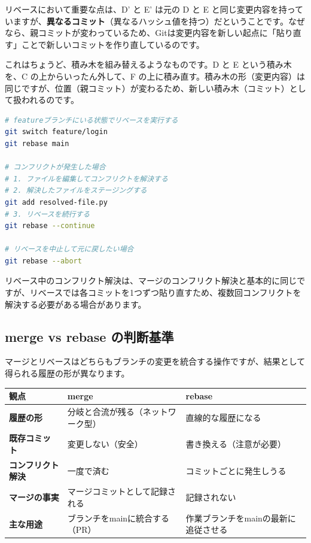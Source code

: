 リベースにおいて重要な点は、D' と E' は元の D と E と同じ変更内容を持っていますが、\textbf{異なるコミット}（異なるハッシュ値を持つ）だということです。なぜなら、親コミットが変わっているため、Gitは変更内容を新しい起点に「貼り直す」ことで新しいコミットを作り直しているのです。

これはちょうど、積み木を組み替えるようなものです。D と E という積み木を、C の上からいったん外して、F の上に積み直す。積み木の形（変更内容）は同じですが、位置（親コミット）が変わるため、新しい積み木（コミット）として扱われるのです。

\begin{lstlisting}[language=bash]
# featureブランチにいる状態でリベースを実行する
git switch feature/login
git rebase main

# コンフリクトが発生した場合
# 1. ファイルを編集してコンフリクトを解決する
# 2. 解決したファイルをステージングする
git add resolved-file.py
# 3. リベースを続行する
git rebase --continue

# リベースを中止して元に戻したい場合
git rebase --abort
\end{lstlisting}

リベース中のコンフリクト解決は、マージのコンフリクト解決と基本的に同じですが、リベースでは各コミットを1つずつ貼り直すため、複数回コンフリクトを解決する必要がある場合があります。

\subsection{merge vs rebase の判断基準}

マージとリベースはどちらもブランチの変更を統合する操作ですが、結果として得られる履歴の形が異なります。

\begin{table}[htbp]
\centering
\begin{tabular}{lp{5cm}p{5cm}}
\hline
\textbf{観点} & \textbf{merge} & \textbf{rebase} \\
\hline
\textbf{履歴の形} & 分岐と合流が残る（ネットワーク型） & 直線的な履歴になる \\
\textbf{既存コミット} & 変更しない（安全） & 書き換える（注意が必要） \\
\textbf{コンフリクト解決} & 一度で済む & コミットごとに発生しうる \\
\textbf{マージの事実} & マージコミットとして記録される & 記録されない \\
\textbf{主な用途} & ブランチをmainに統合する（PR） & 作業ブランチをmainの最新に追従させる \\
\hline
\end{tabular}
\end{table}

